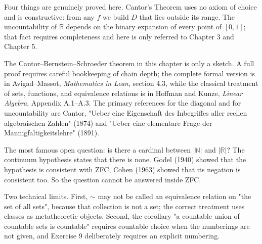 \begin{untukpeneliti}
Four things are genuinely proved here. Cantor's Theorem uses no axiom of choice and is
constructive: from any $f$ we build $D$ that lies outside its range. The
uncountability of $\mathbb{R}$ depends on the binary expansion of every point of
$[0,1]$; that fact requires completeness and here is only referred to Chapter 3 and
Chapter 5.

The Cantor--Bernstein--Schroeder theorem in this chapter is only a sketch. A full
proof requires careful bookkeeping of chain depth; the complete formal version is in
Avigad--Massot, \emph{Mathematics in Lean}, section 4.3, while the classical treatment
of sets, functions, and equivalence relations is in Hoffman and Kunze,
\emph{Linear Algebra}, Appendix A.1--A.3. The primary references for the diagonal and
for uncountability are Cantor, "Ueber eine Eigenschaft des Inbegriffes aller
reellen algebraischen Zahlen" (1874) and "Ueber eine elementare Frage der
Mannigfaltigkeitslehre" (1891).

The most famous open question: is there a cardinal between $|\mathbb{N}|$ and
$|\mathbb{R}|$? The continuum hypothesis states that there is none. Godel (1940) showed
that the hypothesis is consistent with ZFC, Cohen (1963) showed that its negation is
consistent too. So the question cannot be answered inside ZFC.

Two technical limits. First, $\sim$ may not be called an equivalence relation on "the
set of all sets", because that collection is not a set; the correct treatment uses
classes as metatheoretic objects. Second, the corollary "a countable union of
countable sets is countable" requires countable choice when the numberings are not
given, and Exercise 9 deliberately requires an explicit numbering.
\end{untukpeneliti}

